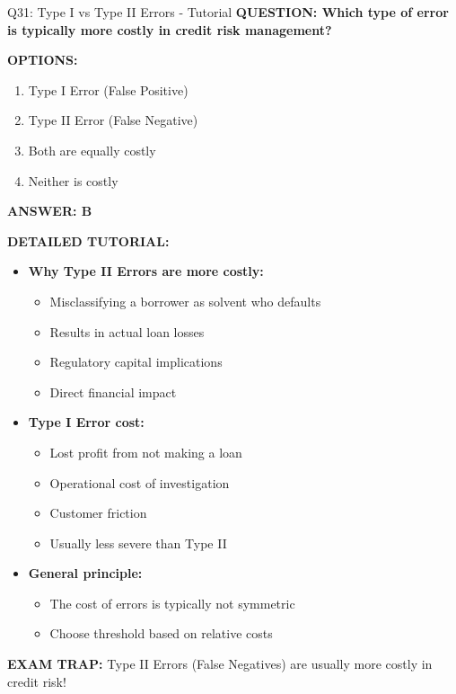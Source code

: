 \documentclass[8pt]{beamer}
\begin{document}
	\begin{frame}{Q31: Type I vs Type II Errors - Tutorial}
		\fontsize{6.5}{7.5}\selectfont
		\textbf{QUESTION: Which type of error is typically more costly in credit risk management?}
		
		\vspace{0.1cm}
		\textbf{OPTIONS:}
		\begin{enumerate}
			\item Type I Error (False Positive)
			\item Type II Error (False Negative)
			\item Both are equally costly
			\item Neither is costly
		\end{enumerate}
		
		\vspace{0.1cm}
		\textcolor{myblue}{\textbf{ANSWER: B}}
		
		\vspace{0.1cm}
		\textbf{DETAILED TUTORIAL:}
		\begin{itemize}
			\item \textbf{Why Type II Errors are more costly:}
			\begin{itemize}
				\item Misclassifying a borrower as solvent who defaults
				\item Results in actual loan losses
				\item Regulatory capital implications
				\item Direct financial impact
			\end{itemize}
			\item \textbf{Type I Error cost:}
			\begin{itemize}
				\item Lost profit from not making a loan
				\item Operational cost of investigation
				\item Customer friction
				\item Usually less severe than Type II
			\end{itemize}
			\item \textbf{General principle:}
			\begin{itemize}
				\item The cost of errors is typically not symmetric
				\item Choose threshold based on relative costs
			\end{itemize}
		\end{itemize}
		
		\textcolor{myred}{\textbf{EXAM TRAP:}} Type II Errors (False Negatives) are \textcolor{myblue}{usually more costly} in credit risk!
	\end{frame}
	
\end{document}
